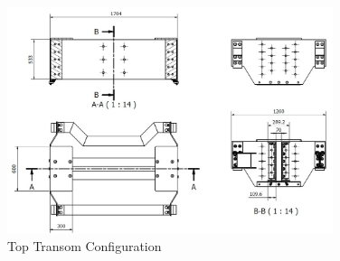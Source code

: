 \documentclass{article}%
\begin{document}
\begin{figure}[h!]%
\includegraphics[width=360px]{Top_Transom.jpg}%
\centering%
\caption{Top Transom Configuration}%
\centering%
\end{figure}
\end{document}
